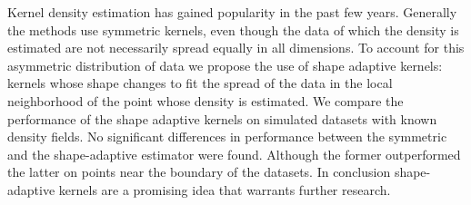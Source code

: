 \noindent Kernel density estimation has gained popularity in the past few years. 
Generally the methods use symmetric kernels, even though the data of which the density is estimated are not necessarily spread equally in all dimensions. To account for this asymmetric distribution of data we propose the use of shape adaptive kernels: kernels whose shape changes to fit the spread of the data in the local neighborhood of the point whose density is estimated.
We compare the performance of the shape adaptive kernels on simulated datasets with known density fields.
No significant differences in performance between the symmetric and the shape-adaptive estimator were found. Although the former outperformed the latter on points near the boundary of the datasets.
In conclusion shape-adaptive kernels are a promising idea that warrants further research.
